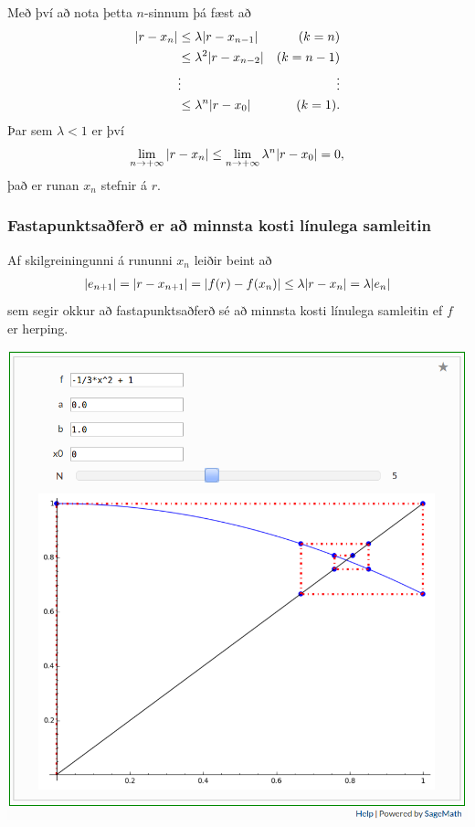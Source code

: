 \documentclass[a4paper,10pt,icelandic]{sphinxmanual}
\begin{document}
Með því að nota þetta \(n\)-sinnum þá fæst að
\begin{gather}
\begin{split}\begin{aligned}
    |r - x_n|   &\leq \lambda |r - x_{n-1}| & (k=n)\\
    &\leq \lambda^2 |r - x_{n-2}| & (k=n-1)\\
    &\vdots & \vdots\\
    &\leq \lambda^n |r - x_0| & (k=1).
\end{aligned}\end{split}\notag
\end{gather}
Þar sem \(\lambda < 1\) er því
\begin{gather}
\begin{split}\lim\limits_{n \to +\infty} |r - x_n|
\leq \lim\limits_{n \to +\infty} \lambda^n |r - x_0|
= 0,\end{split}\notag
\end{gather}
það er runan \(x_n\) stefnir á \(r\).


\subsubsection{Fastapunktsaðferð er að minnsta kosti línulega samleitin}
\label{kafli02:fastapunktsafer-er-a-minnsta-kosti-linulega-samleitin}
Af skilgreiningunni á rununni \(x_n\) leiðir beint að
\begin{gather}
\begin{split}|e_{n+1}|=|r-x_{n+1}|=|f(r)-f(x_n)|\leq \lambda|r-x_n|=\lambda|e_n|\end{split}\notag
\end{gather}
sem segir okkur að fastapunktsaðferð sé að minnsta kosti línulega
samleitin ef \(f\) er herping.


\begin{center}
\includegraphics[width=8 cm,keepaspectratio=true]{fixedpoint.png}

\end{center}
\end{document}
